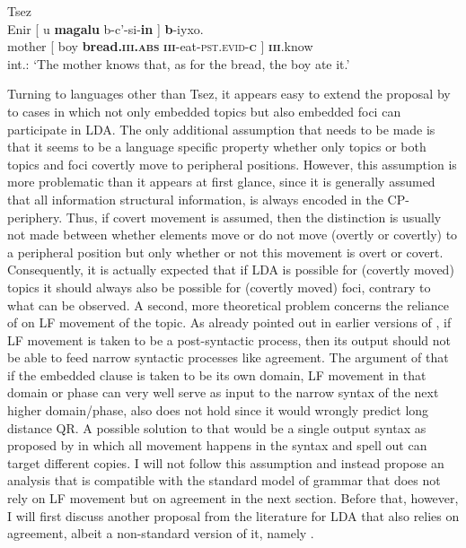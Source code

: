 \documentclass[output=paper
,modfonts
,nonflat]{langsci/langscibook}
\begin{document}
\begin{exe}
\ex Tsez \citep[][635]{Polinsky_Potsdam2001}\label{ex:tsez_comp_block_rep}\\
\gll *Enir [ u \textbf{magalu} b-c’-si-\textbf{\textipa{\textcrlambda}in} ] \textbf{b}-iyxo.\\
mother [ boy \textbf{bread.\textsc{\textbf{iii}.abs}} \textsc{\textbf{iii}}-eat-\textsc{pst.evid}-\textsc{\textbf{c}} ]	\textsc{\textbf{iii}}.know\\
\glt int.: `The mother knows that, as for the bread, the boy ate it.'
\end{exe}
Turning to languages other than Tsez, it appears easy to extend the proposal by \citet{Polinsky_Potsdam2001} to cases in which not only embedded topics but also embedded foci can participate in LDA. The only additional assumption that needs to be made is that it seems to be a language specific property whether only topics or both topics and foci covertly move to peripheral positions. However, this assumption is more problematic than it appears at first glance, since it is generally assumed that all information structural information, is always encoded in the CP-periphery. Thus, if covert movement is assumed, then the distinction is usually not made between whether elements move or do not move (overtly or covertly) to a peripheral position but only whether or not this movement is overt or covert. Consequently, it is actually expected that if LDA is possible for (covertly moved) topics it should always also be possible for (covertly moved) foci, contrary to what can be observed. A second, more theoretical problem concerns the reliance of \citet{Polinsky_Potsdam2001} on LF movement of the topic. As already pointed out in earlier versions of \citet{Bjorkman_Zeijlstra2014}, if LF movement is taken to be a post-syntactic process, then its output should not be able to feed narrow syntactic processes like agreement. The argument of \citet{Preminger_Polinsky2015} that if the embedded clause is taken to be its own domain, LF movement in that domain or phase can very well serve as input to the narrow syntax of the next higher domain/phase, also does not hold since it would wrongly predict long distance QR. A possible solution to that would be a single output syntax as proposed by \citet{Bobaljik2002} in which all movement happens in the syntax and spell out can target different copies. I will not follow this assumption and instead propose an analysis that is compatible with the standard model of grammar that does not rely on LF movement but on agreement in the next section. Before that, however, I will first discuss another proposal from the literature for LDA that also relies on agreement, albeit a non-standard version of it, namely \citet{Bjorkman_Zeijlstra2014}.
\end{document}
